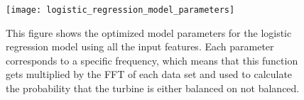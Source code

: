 \begin{figure}
	\centering
	\texttt{[image: logistic\_regression\_model\_parameters]}
	\decoRule
	\caption{This figure shows the optimized model parameters for the logistic regression model using all the input features.  Each parameter corresponds to a specific frequency, which means that this function gets multiplied by the FFT of each data set and used to calculate the probability that the turbine is either balanced on not balanced.}
	\label{fig:logistic_regression_model_parameters}
\end{figure}


%
%
%
%
%
%
%
